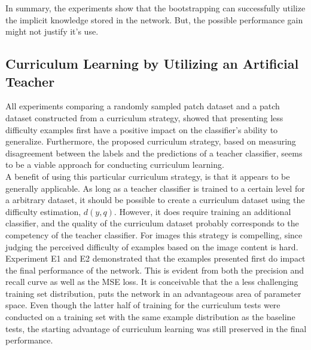 In summary, the experiments show that the bootstrapping can successfully utilize the implicit knowledge stored in the network. But, the possible performance gain might not justify it's use. \\


\subsection{Curriculum Learning by Utilizing an Artificial Teacher}
All experiments comparing a randomly sampled patch dataset and a patch dataset constructed from a curriculum strategy, showed that presenting less difficulty examples first have a positive impact on the classifier's ability to generalize.  Furthermore, the proposed curriculum strategy, based on measuring disagreement between the labels and the predictions of a teacher classifier, seems to be a viable approach for conducting curriculum learning. \\

A benefit of using this particular curriculum strategy, is that it appears to be generally applicable. As long as a teacher classifier is trained to a certain level for a arbitrary dataset, it should be possible to create a curriculum dataset using the difficulty estimation, $d(y,q)$. However, it does require training an additional classifier, and the quality of the curriculum dataset probably corresponds to the competency of the teacher classifier. For images this strategy is compelling, since judging the perceived difficulty of examples based on the image content is hard.\\

Experiment E1 and E2 demonstrated that the examples presented first do impact the final performance of the network. This is evident from both the precision and recall curve as well as the MSE loss. It is conceivable that the a less challenging training set distribution, puts the network in an advantageous area of parameter space. Even though the latter half of training for the curriculum tests were conducted on a training set with the same example distribution as the baseline tests, the starting advantage of curriculum learning was still preserved in the final performance.  \\

